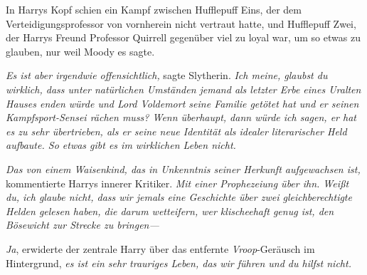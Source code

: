 In Harrys Kopf schien ein Kampf zwischen Hufflepuff Eins, der dem Verteidigungsprofessor von vornherein nicht vertraut hatte, und Hufflepuff Zwei, der Harrys Freund Professor Quirrell gegenüber viel zu loyal war, um so etwas zu glauben, nur weil Moody es sagte.

\emph{Es \emph{ist} aber irgendwie offensichtlich,} sagte Slytherin. \emph{Ich meine, glaubst du wirklich, dass unter natürlichen Umständen jemand als letzter Erbe eines Uralten Hauses enden würde \emph{und} Lord Voldemort seine Familie getötet hat \emph{und} er seinen Kampfsport-Sensei rächen muss? Wenn überhaupt, dann würde ich sagen, er hat es zu sehr übertrieben, als er seine neue Identität als idealer literarischer Held aufbaute. So etwas gibt es im wirklichen Leben nicht.}

\emph{Das von einem Waisenkind, das in Unkenntnis seiner Herkunft aufgewachsen ist,} kommentierte Harrys innerer Kritiker. \emph{Mit einer Prophezeiung über ihn. Weißt du, ich glaube nicht, dass wir jemals eine Geschichte über zwei gleichberechtigte Helden gelesen haben, die darum wetteifern, wer klischeehaft genug ist, den Bösewicht zur Strecke zu bringen—}

\emph{Ja}, erwiderte der zentrale Harry über das entfernte \emph{Vroop}-Geräusch im Hintergrund, \emph{es ist ein sehr trauriges Leben, das wir führen und \emph{du hilfst nicht}.}

